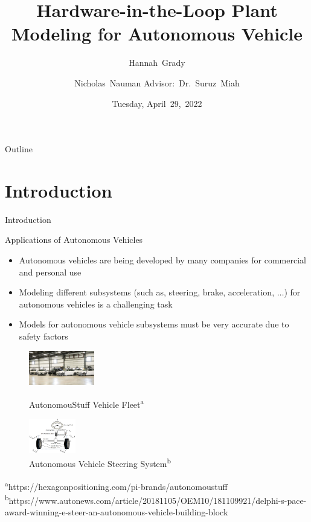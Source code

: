 \documentclass{beamer}
\title[HIL Plant Modeling]{Hardware-in-the-Loop Plant Modeling for Autonomous Vehicle}
\author[H.~Grady, N.~Nauman]{Hannah~Grady \and Nicholas~Nauman 
\linebreak Advisor:~Dr.~Suruz~Miah}
\institute[Bradley University] %
{
  Department of Electrical and Computer Engineering\\
  Bradley University\\
  1501 W. Bradley Avenue\\
  Peoria, IL, 61625, USA
}
\date[April~29,~2022]{Tuesday, April~29,~2022}
\begin{document}
\begin{frame}
  \titlepage
\end{frame}

\begin{frame}{Outline} 
  \tableofcontents%
\end{frame}

\section{Introduction}

\begin{frame}{Introduction}{}
	\begin{block}{Applications of Autonomous Vehicles}
    	\begin{itemize}
    		\item Autonomous vehicles are being developed by many companies for commercial and personal use
    		\item Modeling different subsystems (such as, steering, brake,
          acceleration, $\ldots$)  for autonomous vehicles is a challenging task
     		\item Models for autonomous vehicle subsystems must be very accurate due to safety factors
		\end{itemize}
    \end{block}
        \begin{figure}
			\centering
			\begin{minipage}[t]{0.4\textwidth}
				\centering
				\includegraphics[height=1.5cm]{figs/img/autonomousVehiclesAStuff}
				\caption{AutonomouStuff Vehicle Fleet\textsuperscript{a}}
				\label{fig:fleet}
			\end{minipage}
			\begin{minipage}[t]{0.4\textwidth}
				\centering
				\includegraphics[height=1.5cm]{figs/img/autonomousVehiclesSteering}
				\caption{Autonomous Vehicle Steering System\textsuperscript{b}}
				\label{fig:steerSystem}
			\end{minipage}
        \end{figure}
    \begin{tiny}
		\textsuperscript{a}https://hexagonpositioning.com/pi-brands/autonomoustuff\\\textsuperscript{b}https://www.autonews.com/article/20181105/OEM10/181109921/delphi-s-pace-award-winning-e-steer-an-autonomous-vehicle-building-block
    \end{tiny}
\end{frame}
\end{document}

